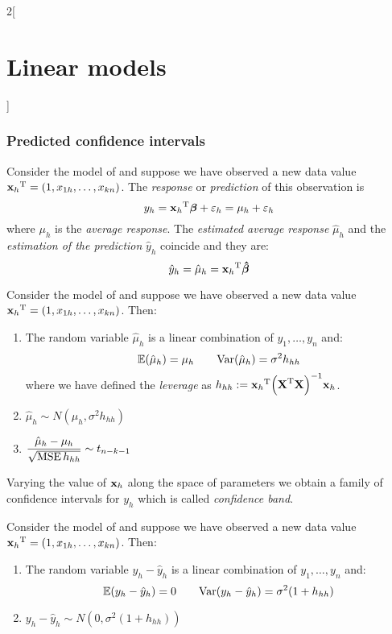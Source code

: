 \documentclass[../../../main_math.tex]{subfiles}
\begin{document}
\begin{multicols}{2}[\section{Linear models}]
  \subsubsection{Predicted confidence intervals}
  \begin{definition}
    Consider the model of  and suppose we have observed a new data value ${\boldsymbol{\mathrm{x}}_h}^{\mathrm{T}}=(1,x_{1h},\ldots,x_{kn})$. The \emph{response} or \emph{prediction} of this observation is $$y_h={\boldsymbol{\mathrm{x}}_h}^{\mathrm{T}}\boldsymbol{\mathrm{\beta}}+\varepsilon_h=\mu_h+\varepsilon_h$$
    where $\mu_h$ is the \emph{average response}. The \emph{estimated average response} $\hat\mu_h$ and the \emph{estimation of the prediction} $\hat{y}_h$ coincide and they are: $$\hat{y}_h=\hat\mu_h={\boldsymbol{\mathrm{x}}_h}^{\mathrm{T}}\boldsymbol{\mathrm{\hat\beta}}$$
  \end{definition}
  \begin{proposition}
    Consider the model of  and suppose we have observed a new data value ${\boldsymbol{\mathrm{x}}_h}^{\mathrm{T}}=(1,x_{1h},\ldots,x_{kn})$. Then:
    \begin{enumerate}
      \item The random variable $\hat\mu_h$ is a linear combination of $y_1,\ldots,y_n$ and: $$\mathbb{E}(\hat\mu_h)=\mu_h\qquad\mathrm{Var}(\hat\mu_h)=\sigma^2h_{hh}$$ where we have defined the \emph{leverage} as $h_{hh}:={\boldsymbol{\mathrm{x}}_h}^{\mathrm{T}}{\left({\boldsymbol{\mathrm{X}}}^{\mathrm{T}}\boldsymbol{\mathrm{X}}\right)}^{-1}\boldsymbol{\mathrm{x}}_h$.
      \item $\hat\mu_h\sim N(\mu_h,\sigma^2h_{hh})$
      \item $\displaystyle\frac{\hat\mu_h-\mu_h}{\sqrt{\operatorname{MSE} h_{hh}}}\sim t_{n-k-1}$
    \end{enumerate}
    Varying the value of $\boldsymbol{\mathrm{x}}_h$ along the space of parameters we obtain a family of confidence intervals for $y_h$ which is called \emph{confidence band}.
  \end{proposition}
  \begin{proposition}
    Consider the model of  and suppose we have observed a new data value ${\boldsymbol{\mathrm{x}}_h}^{\mathrm{T}}=(1,x_{1h},\ldots,x_{kn})$. Then:
    \begin{enumerate}
      \item The random variable $y_h-\hat{y}_h$ is a linear combination of $y_1,\ldots,y_n$ and: $$\mathbb{E}(y_h-\hat{y}_h)=0\qquad\mathrm{Var}(y_h-\hat{y}_h)=\sigma^2(1+h_{hh})$$
      \item $y_h-\hat{y}_h\sim N(0,\sigma^2(1+h_{hh}))$

\end{enumerate}
\end{proposition}
\end{multicols}
\end{document}
